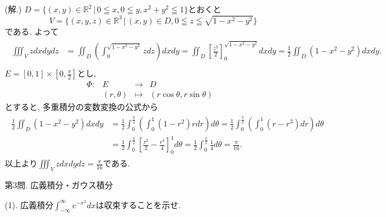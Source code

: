 \documentclass[dvipdfmx,a4paper,11pt]{article}
\newcommand{\R}{\mathbb{R}}
\theoremstyle{definition}
\begin{document}
\hspace{-11pt}(解.)
$D=\{ (x,y) \in \R^2 \, | \, 0 \leqq x, 0 \leqq y, x^2 + y^2 \leqq 1\}$とおくと
$$
V = \{ (x,y,z) \in \R^3 \,|\, (x,y) \in D, 0 \leqq z \leqq  \sqrt{1 -x^2 -y^2} \}
$$
である. よって
\begin{align*}
\begin{split}
\iiint_{V} zdxdydz 
&=
\iint_{D} \left( \int^{\sqrt{1 -x^2 -y^2}}_{0}  z dz \right) dxdy
= \iint_{D} \left[ \frac{z^2}{2}\right]^{\sqrt{1 -x^2 -y^2}}_{0}dxdy =\frac{1}{2} \iint_{D}(1 -x^2 -y^2) dxdy. \\
    \end{split}
  \end{align*}
 $E=[0,1]\times[0,\frac{\pi}{2}]$とし, 
 $$
\begin{array}{ccccc}
\Phi: &E & \rightarrow & D & \\
&(r,\theta) & \longmapsto & (r \cos \theta , r \sin \theta)&
\end{array}
$$
とすると, 多重積分の変数変換の公式から
\begin{align*}
\begin{split}
\frac{1}{2} \iint_{D}(1 -x^2 -y^2) dxdy
&= 
\frac{1}{2}\int_{0}^{\frac{\pi}{2}} \left( \int_{0}^{1}(1-r^2)r dr\right)d\theta 
= 
\frac{1}{2}\int_{0}^{\frac{\pi}{2}} \left( \int_{0}^{1}(r-r^3) dr\right)d\theta \\
&= 
\frac{1}{2}\int_{0}^{\frac{\pi}{2}} \left[  \frac{r^2}{2} - \frac{r^4}{4}\right]^{1}_{0}d\theta 
= 
\frac{1}{2}\int_{0}^{\frac{\pi}{2}}\frac{1}{4} d\theta 
=\frac{\pi}{16}.
    \end{split}
  \end{align*}
  以上より$\iiint_{V} zdxdydz  = \frac{\pi}{16}$である.
  \vspace{7pt}
  


\vspace{33pt}

{\Large 第3問.} 広義積分・ガウス積分
\vspace{11pt}

{\large(1). 広義積分$\int_{- \infty}^{\infty} e^{- x^2} dx$は収束することを示せ.}\vspace{7pt}
\end{document}
